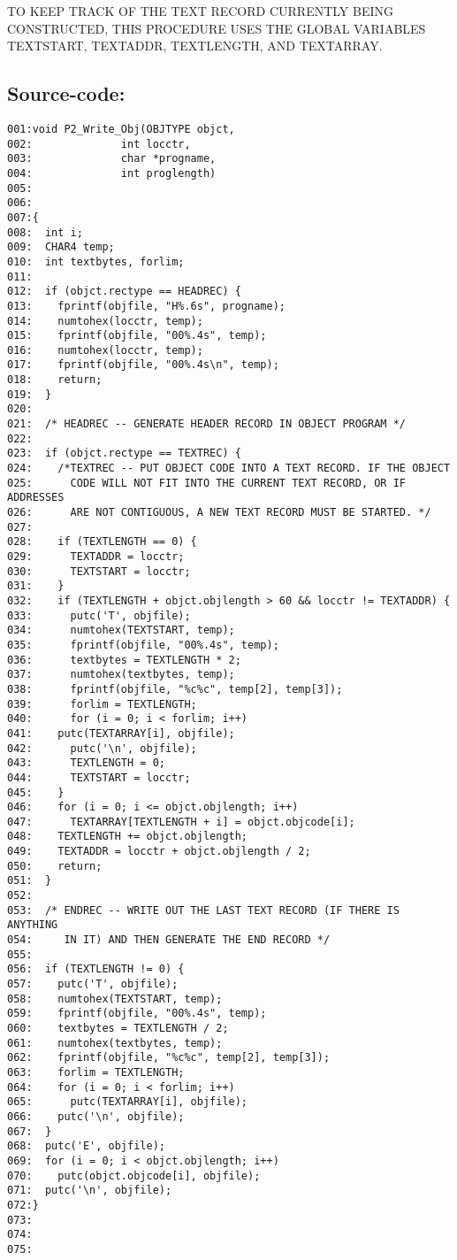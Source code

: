 TO KEEP TRACK OF THE TEXT RECORD CURRENTLY BEING CONSTRUCTED, THIS PROCEDURE
USES THE GLOBAL VARIABLES TEXTSTART, TEXTADDR, TEXTLENGTH, AND TEXTARRAY.
\subsection*{Source-code:}
\begin{verbatim}
001:void P2_Write_Obj(OBJTYPE objct,
002:              int locctr,
003:              char *progname,
004:              int proglength)
005:
006:
007:{
008:  int i;
009:  CHAR4 temp;
010:  int textbytes, forlim;
011:
012:  if (objct.rectype == HEADREC) {
013:    fprintf(objfile, "H%.6s", progname);
014:    numtohex(locctr, temp);
015:    fprintf(objfile, "00%.4s", temp);
016:    numtohex(locctr, temp);
017:    fprintf(objfile, "00%.4s\n", temp);
018:    return;
019:  }
020:
021:  /* HEADREC -- GENERATE HEADER RECORD IN OBJECT PROGRAM */
022:
023:  if (objct.rectype == TEXTREC) {
024:    /*TEXTREC -- PUT OBJECT CODE INTO A TEXT RECORD. IF THE OBJECT
025:      CODE WILL NOT FIT INTO THE CURRENT TEXT RECORD, OR IF ADDRESSES
026:      ARE NOT CONTIGUOUS, A NEW TEXT RECORD MUST BE STARTED. */
027:
028:    if (TEXTLENGTH == 0) {
029:      TEXTADDR = locctr;
030:      TEXTSTART = locctr;
031:    }
032:    if (TEXTLENGTH + objct.objlength > 60 && locctr != TEXTADDR) {
033:      putc('T', objfile);
034:      numtohex(TEXTSTART, temp);
035:      fprintf(objfile, "00%.4s", temp);
036:      textbytes = TEXTLENGTH * 2;
037:      numtohex(textbytes, temp);
038:      fprintf(objfile, "%c%c", temp[2], temp[3]);
039:      forlim = TEXTLENGTH;
040:      for (i = 0; i < forlim; i++)
041:    putc(TEXTARRAY[i], objfile);
042:      putc('\n', objfile);
043:      TEXTLENGTH = 0;
044:      TEXTSTART = locctr;
045:    }
046:    for (i = 0; i <= objct.objlength; i++)
047:      TEXTARRAY[TEXTLENGTH + i] = objct.objcode[i];
048:    TEXTLENGTH += objct.objlength;
049:    TEXTADDR = locctr + objct.objlength / 2;
050:    return;
051:  }
052:
053:  /* ENDREC -- WRITE OUT THE LAST TEXT RECORD (IF THERE IS ANYTHING
054:     IN IT) AND THEN GENERATE THE END RECORD */
055:
056:  if (TEXTLENGTH != 0) {
057:    putc('T', objfile);
058:    numtohex(TEXTSTART, temp);
059:    fprintf(objfile, "00%.4s", temp);
060:    textbytes = TEXTLENGTH / 2;
061:    numtohex(textbytes, temp);
062:    fprintf(objfile, "%c%c", temp[2], temp[3]);
063:    forlim = TEXTLENGTH;
064:    for (i = 0; i < forlim; i++)
065:      putc(TEXTARRAY[i], objfile);
066:    putc('\n', objfile);
067:  }
068:  putc('E', objfile);
069:  for (i = 0; i < objct.objlength; i++)
070:    putc(objct.objcode[i], objfile);
071:  putc('\n', objfile);
072:}
073:
074:
075:
\end{verbatim}
